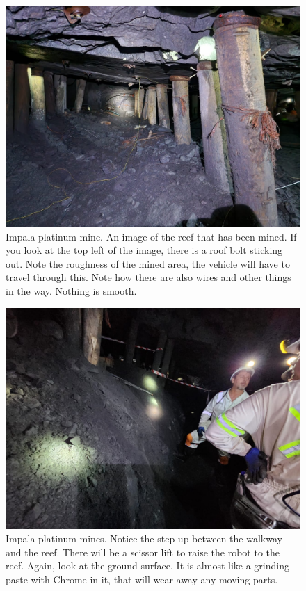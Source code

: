 	\begin{figure}[H]
		\centering
		\includegraphics[width=0.7\linewidth]{Images/Impala2}
		\caption{Impala platinum mine. An image of the reef that has been mined. If you look at the top left of the image, there is a roof bolt sticking out. Note the roughness of the mined area, the vehicle will have to travel through this. Note how there are also wires and other things in the way. Nothing is smooth.}
		\label{fig:Impala2}
	\end{figure}

	\begin{figure}[H]
		\centering
		\includegraphics[width=0.7\linewidth]{Images/Impala3}
		\caption{Impala platinum mines. Notice the step up between the walkway and the reef. There will be a scissor lift to raise the robot to the reef. Again, look at the ground surface. It is almost like a grinding paste with Chrome in it, that will wear away any moving parts. }
		\label{fig:Impala3}
	\end{figure}
	
